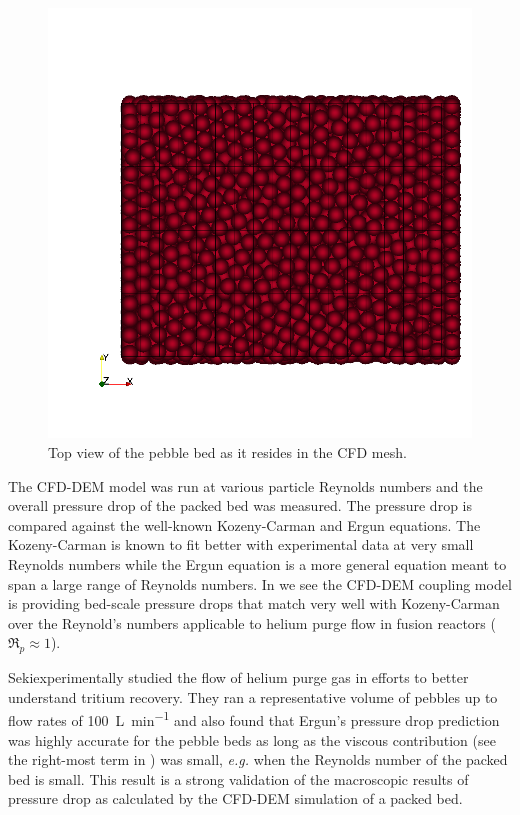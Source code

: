 \begin{figure}[t]
	\centering
	\includegraphics[width=\singleimagewidth]{figures/z-top-view}
    \caption{Top view of the pebble bed as it resides in the CFD mesh.}\label{fig:cfdem-domain-z}
\end{figure}


The CFD-DEM model was run at various particle Reynolds numbers and the overall pressure drop of the packed bed was measured. The pressure drop is compared against the well-known Kozeny-Carman and Ergun equations. The Kozeny-Carman is known to fit better with experimental data at very small Reynolds numbers while the Ergun equation is a more general equation meant to span a large range of Reynolds numbers. In  we see the CFD-DEM coupling model is providing bed-scale pressure drops that match very well with Kozeny-Carman over the Reynold’s numbers applicable to helium purge flow in fusion reactors ($\Re_p \approx 1$). 

Seki\etal experimentally studied the flow of helium purge gas in efforts to better understand tritium recovery.\cite{Seki2013a} They ran a representative volume of pebbles up to flow rates of \SI{100}{\liter\per\minute} and also found that Ergun's pressure drop prediction was highly accurate for the pebble beds as long as the viscous contribution (see the right-most term in ) was small, \textit{e.g.} when the Reynolds number of the packed bed is small. This result is a strong validation of the macroscopic results of pressure drop as calculated by the CFD-DEM simulation of a packed bed.

